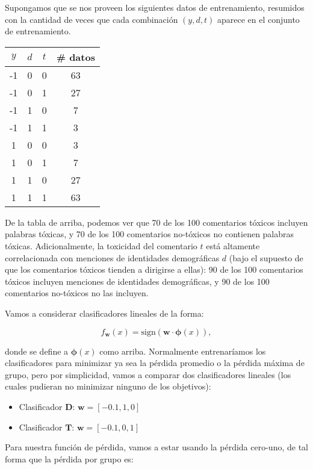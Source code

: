 \documentclass[11pt,letterpaper]{article}
\begin{document}
Supongamos que se nos proveen los siguientes datos de entrenamiento, resumidos con la cantidad de veces que cada combinación $(y, d, t)$ aparece en el conjunto de entrenamiento.

\begin{center}
    \begin{tabular}{|c|c|c|c|}
    \hline
    $y$ & $d$ & $t$ & \# datos \\ 
    \hline
    -1 & 0 & 0 & 63 \\
    -1 & 0 & 1 & 27 \\
    -1 & 1 & 0 & 7 \\
    -1 & 1 & 1 & 3 \\
    1 & 0 & 0 & 3 \\
    1 & 0 & 1 & 7 \\
    1 & 1 & 0 & 27 \\
    1 & 1 & 1 & 63 \\
    \hline
    \end{tabular}
\end{center}

De la tabla de arriba, podemos ver que 70 de los 100 comentarios tóxicos incluyen palabras tóxicas, y 70 de los 100 comentarios no-tóxicos no contienen palabras tóxicas. Adicionalmente, la toxicidad del comentario $t$ está altamente correlacionada con menciones de identidades demográficas $d$ (bajo el supuesto de que los comentarios tóxicos tienden a dirigirse a ellas): 90 de los 100 comentarios tóxicos incluyen menciones de identidades demográficas, y 90 de los 100 comentarios no-tóxicos no las incluyen.

Vamos a considerar clasificadores lineales de la forma:

\[
f_{\mathbf{w}}(x) = \text{sign}(\mathbf{w} \cdot \boldsymbol{\phi}(x)),
\]

donde se define a $\boldsymbol{\phi}(x)$ como arriba. Normalmente entrenaríamos los clasificadores para minimizar ya sea la pérdida promedio o la pérdida máxima de grupo, pero por simplicidad, vamos a comparar dos clasificadores lineales (los cuales pudieran no minimizar ninguno de los objetivos):

\begin{itemize}
    \item Clasificador $\mathbf{D}$: $\mathbf{w} = [-0.1, 1, 0]$
    \item Clasificador $\mathbf{T}$: $\mathbf{w} = [-0.1, 0, 1]$
\end{itemize}

Para nuestra función de pérdida, vamos a estar usando la pérdida cero-uno, de tal forma que la pérdida por grupo es:
\end{document}
